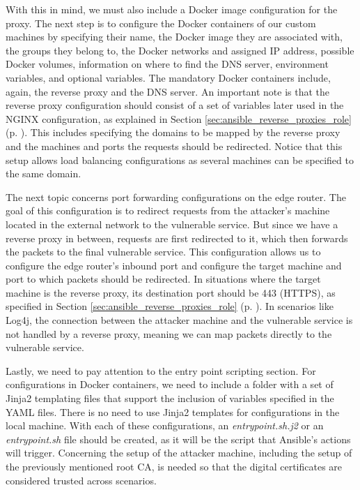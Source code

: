 With this in mind, we must also include a Docker image configuration for the proxy. The next step is to configure the Docker containers of our custom machines by specifying their name, the Docker image they are associated with, the groups they belong to, the Docker networks and assigned IP address, possible Docker volumes, information on where to find the DNS server, environment variables, and optional variables. The mandatory Docker containers include, again, the reverse proxy and the DNS server. An important note is that the reverse proxy configuration should consist of a set of variables later used in the NGINX configuration, as explained in Section \ref{sec:ansible_reverse_proxies_role} (p. \pageref{sec:ansible_reverse_proxies_role}). This includes specifying the domains to be mapped by the reverse proxy and the machines and ports the requests should be redirected. Notice that this setup allows load balancing configurations as several machines can be specified to the same domain. 

The next topic concerns port forwarding configurations on the edge router. The goal of this configuration is to redirect requests from the attacker's machine located in the external network to the vulnerable service. But since we have a reverse proxy in between, requests are first redirected to it, which then forwards the packets to the final vulnerable service. This configuration allows us to configure the edge router's inbound port and configure the target machine and port to which packets should be redirected. In situations where the target machine is the reverse proxy, its destination port should be 443 (HTTPS), as specified in Section \ref{sec:ansible_reverse_proxies_role} (p. \pageref{sec:ansible_reverse_proxies_role}). In scenarios like Log4j, the connection between the attacker machine and the vulnerable service is not handled by a reverse proxy, meaning we can map packets directly to the vulnerable service.

Lastly, we need to pay attention to the entry point scripting section. For configurations in Docker containers, we need to include a folder with a set of Jinja2 templating files that support the inclusion of variables specified in the YAML files. There is no need to use Jinja2 templates for configurations in the local machine. With each of these configurations, an \textit{entrypoint.sh.j2} or an \textit{entrypoint.sh} file should be created, as it will be the script that Ansible's actions will trigger. Concerning the setup of the attacker machine, including the setup of the previously mentioned root CA, is needed so that the digital certificates are considered trusted across scenarios.

